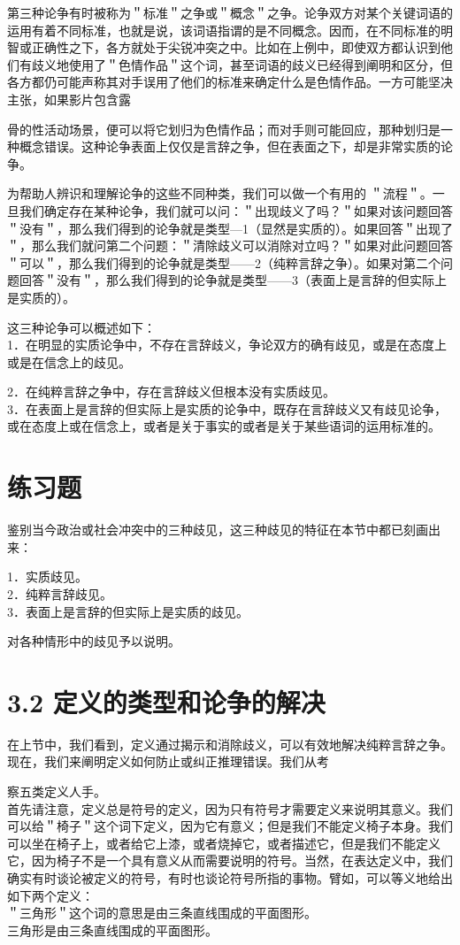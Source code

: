 第三种论争有时被称为＂标准＂之争或＂概念＂之争。论争双方对某个关键词语的运用有着不同标准，也就是说，该词语指谓的是不同概念。因而，在不同标准的明智或正确性之下，各方就处于尖锐冲突之中。比如在上例中，即使双方都认识到他们有歧义地使用了＂色情作品＂这个词，甚至词语的歧义已经得到阐明和区分，但各方都仍可能声称其对手误用了他们的标准来确定什么是色情作品。一方可能坚决主张，如果影片包含露

骨的性活动场景，便可以将它划归为色情作品；而对手则可能回应，那种划归是一种概念错误。这种论争表面上仅仅是言辞之争，但在表面之下，却是非常实质的论争。

为帮助人辨识和理解论争的这些不同种类，我们可以做一个有用的 ＂流程＂。一旦我们确定存在某种论争，我们就可以问：＂出现歧义了吗？＂如果对该问题回答＂没有＂，那么我们得到的论争就是类型—1（显然是实质的）。如果回答＂出现了＂，那么我们就问第二个问题：＂清除歧义可以消除对立吗？＂如果对此问题回答＂可以＂，那么我们得到的论争就是类型——2（纯粹言辞之争）。如果对第二个问题回答＂没有＂，那么我们得到的论争就是类型——3（表面上是言辞的但实际上是实质的）。

这三种论争可以概述如下：\\
1．在明显的实质论争中，不存在言辞歧义，争论双方的确有歧见，或是在态度上或是在信念上的歧见。

2．在纯粹言辞之争中，存在言辞歧义但根本没有实质歧见。\\
3．在表面上是言辞的但实际上是实质的论争中，既存在言辞歧义又有歧见论争，或在态度上或在信念上，或者是关于事实的或者是关于某些语词的运用标准的。

\section*{练习题}
鉴别当今政治或社会冲突中的三种歧见，这三种歧见的特征在本节中都已刻画出来：

1．实质歧见。\\
2．纯粹言辞歧见。\\
3．表面上是言辞的但实际上是实质的歧见。

对各种情形中的歧见予以说明。

\section*{3.2 定义的类型和论争的解决}
在上节中，我们看到，定义通过揭示和消除歧义，可以有效地解决纯粹言辞之争。现在，我们来阐明定义如何防止或纠正推理错误。我们从考

察五类定义人手。\\
首先请注意，定义总是符号的定义，因为只有符号才需要定义来说明其意义。我们可以给＂椅子＂这个词下定义，因为它有意义；但是我们不能定义椅子本身。我们可以坐在椅子上，或者给它上漆，或者烧掉它，或者描述它，但是我们不能定义它，因为椅子不是一个具有意义从而需要说明的符号。当然，在表达定义中，我们确实有时谈论被定义的符号，有时也谈论符号所指的事物。臂如，可以等义地给出如下两个定义：\\
＂三角形＂这个词的意思是由三条直线围成的平面图形。\\
三角形是由三条直线围成的平面图形。

